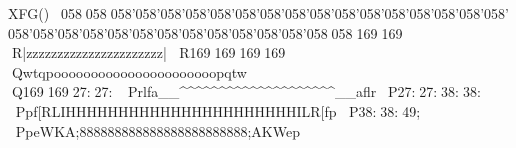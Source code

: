 XFG     (   )                                058058058'058'058'058'058'058'058'058'058'058'058'058'058'058'058'058'058'058'058'058'058'058'058'058'058'058'058'058'058058                            169169
R   |   {   {   z   z   z   z   z   z   z   z   z   z   z   z   z   z   z   z   z   z   z   z   z   z   {   {   |
R169169                    169169
Q   w   t   q   p   o   o   o   o   o   o   o   o   o   o   o   o   o   o   o   o   o   o   o   o   o   o   p   q   t   w
Q169169            27:27:P   r   l   f   a   _   _   ^   ^   ^   ^   ^   ^   ^   ^   ^   ^   ^   ^   ^   ^   ^   ^   ^   ^   ^   ^   _   _   a   f   l   rP27:27:    38:38:
P   p   f   [   R   L   I   H   H   H   H   H   H   H   H   H   H   H   H   H   H   H   H   H   H   H   H   H   H   I   L   R   [   f   p
P38:38:49;
P   p   e   W   K   A   ;   8   8   8   8   8   8   8   8   8   8   8   8   8   8   8   8   8   8   8   8   8   8   8   8   ;   A   K   W   e   p
}}}}
